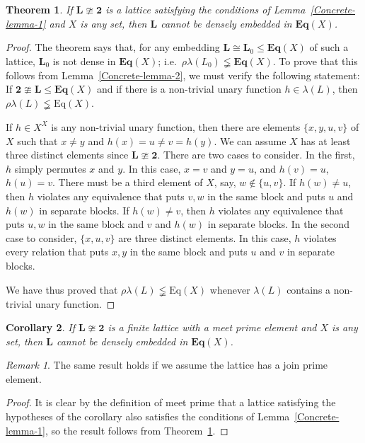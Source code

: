\documentclass[cm,dissertation]{uhthesis}
\theoremstyle{plain}
\newtheorem{theorem}{Theorem}[section]
\newtheorem{corollary}[theorem]{Corollary}
\theoremstyle{definition}
\theoremstyle{remark}
\newtheorem*{remark}{Remark}
\numberwithin{theorem}{section}
\numberwithin{claim}{chapter}
\numberwithin{equation}{section}
\numberwithin{conjecture}{chapter}
\newcommand{\<}{\ensuremath{\langle}}
\renewcommand{\>}{\ensuremath{\rangle}}
\renewcommand{\leq}{\ensuremath{\leqslant}}
\newcommand{\EqX}{\ensuremath{\mbox{Eq}(X)}}
\newcommand{\bEqX}{\ensuremath{\mathbf{Eq}(X)}}
\newcommand{\0}{\ensuremath{\mathbf{0}}}
\newcommand{\1}{\ensuremath{\mathbf{1}}}
\newcommand{\2}{\ensuremath{\mathbf{2}}}
\newcommand{\3}{\ensuremath{\mathbf{3}}}
\newcommand{\4}{\ensuremath{\mathbf{4}}}
\newcommand{\5}{\ensuremath{\mathbf{5}}}
\newcommand{\bL}{\ensuremath{\mathbf{L}}}
\begin{document}
\begin{theorem}\label{Concrete-thm-1} If $\bL\ncong \mathbf{2}$ is a lattice satisfying the conditions of Lemma~\ref{Concrete-lemma-1}
  and $X$ is any set, then $\bL$ cannot be densely embedded in $\bEqX$.
\end{theorem}
\begin{proof}
The theorem says that, for any embedding $\bL\cong \bL_0 \leq \bEqX$ of
such a lattice, $\bL_0$ is not dense in $\bEqX$; 
i.e.~$\rho \lambda(L_0) \lneqq  \bEqX$.  
To prove that this follows from Lemma~\ref{Concrete-lemma-2}, we must verify 
the following statement: If $\mathbf{2} \ncong \bL \leq \bEqX$
and if there is a non-trivial unary function $h\in \lambda(L)$, then 
$\rho \lambda(L) \lneqq \EqX$.

If $h\in X^X$ is any non-trivial unary function, then there are elements 
$\{x, y, u, v\}$ of $X$ such that $x\neq y$ and $h(x) = u \neq v = h(y)$.
We can assume $X$ has at least three distinct elements since $\bL \ncong \mathbf{2}$.
There are two cases to consider.  In the first, $h$ simply permutes $x$ and $y$.
In this case, $x=v$ and $y=u$, and $h(v) = u$, $h(u)=v$. There must be a third
element of $X$, say, $w\notin \{u,v\}$.  
If $h(w) \neq u$, then $h$ violates any equivalence that puts $v, w$ in the same
block and puts $u$ and $h(w)$ in separate blocks. 
If $h(w) \neq v$, then $h$ violates any equivalence that puts $u, w$ in the same
block and $v$ and $h(w)$ in separate blocks. 
In the second case to consider, $\{x, u, v\}$ are three distinct elements. In
this case, $h$ violates every relation that puts $x, y$ in the same block and puts
$u$ and $v$ in separate blocks. 

We have thus proved that $\rho \lambda(L) \lneqq \EqX$ whenever $\lambda(L)$ contains
a non-trivial unary function.
\end{proof}

\begin{corollary}\label{Concrete-cor-2}
If $\bL\ncong \mathbf{2}$ is a finite lattice with a meet prime element and $X$ is any set, then $\bL$ cannot
be densely embedded in $\bEqX$.
\end{corollary}
\begin{remark}
  The same result holds if we assume the lattice has a join prime element.
\end{remark}
\begin{proof}
It is clear by the definition of meet prime that a lattice 
satisfying the hypotheses of the corollary also satisfies the conditions
of Lemma~\ref{Concrete-lemma-1}, so the result follows from
Theorem~\ref{Concrete-thm-1}. 
\end{proof}
\end{document}
